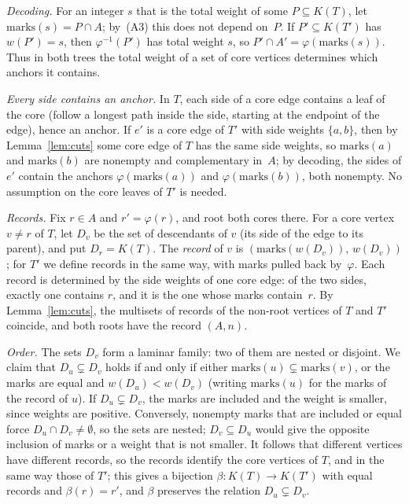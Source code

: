 \documentclass[11pt]{article}
\theoremstyle{definition}
\theoremstyle{remark}
\begin{document}
\emph{Decoding.} For an integer $s$ that is the total weight of some
$P\subseteq K(T)$, let $\mathrm{marks}(s)=P\cap A$; by~(A3) this does not depend
on~$P$. If $P'\subseteq K(T')$ has $w(P')=s$, then $\varphi^{-1}(P')$ has total
weight $s$, so $P'\cap A'=\varphi(\mathrm{marks}(s))$. Thus in both trees the
total weight of a set of core vertices determines which anchors it contains.

\emph{Every side contains an anchor.} In $T$, each side of a core edge contains
a leaf of the core (follow a longest path inside the side, starting at the
endpoint of the edge), hence an anchor. If $e'$ is a core edge of $T'$ with side
weights $\{a,b\}$, then by Lemma~\ref{lem:cuts} some core edge of $T$ has the same
side weights, so $\mathrm{marks}(a)$ and $\mathrm{marks}(b)$ are nonempty and
complementary in~$A$; by decoding, the sides of $e'$ contain the anchors
$\varphi(\mathrm{marks}(a))$ and $\varphi(\mathrm{marks}(b))$, both nonempty. No
assumption on the core leaves of $T'$ is needed.

\emph{Records.} Fix $r\in A$ and $r'=\varphi(r)$, and root both cores there. For
a core vertex $v\ne r$ of $T$, let $D_v$ be the set of descendants of $v$ (its
side of the edge to its parent), and put $D_r=K(T)$. The \emph{record} of $v$ is
$(\mathrm{marks}(w(D_v)),\,w(D_v))$; for $T'$ we define records in the same way,
with marks pulled back by~$\varphi$. Each record is determined by the side weights
of one core edge: of the two sides, exactly one contains $r$, and it is the one
whose marks contain~$r$. By Lemma~\ref{lem:cuts}, the multisets of records of the
non-root vertices of $T$ and $T'$ coincide, and both roots have the record
$(A,n)$.

\emph{Order.} The sets $D_v$ form a laminar family: two of them are nested or
disjoint. We claim that $D_u\subsetneq D_v$ holds if and only if either
$\mathrm{marks}(u)\subsetneq\mathrm{marks}(v)$, or the marks are equal and
$w(D_u)<w(D_v)$ (writing $\mathrm{marks}(u)$ for the marks of the record of $u$).
If $D_u\subsetneq D_v$, the marks are included and the weight is smaller, since
weights are positive. Conversely, nonempty marks that are included or equal force
$D_u\cap D_v\ne\emptyset$, so the sets are nested; $D_v\subseteq D_u$ would give
the opposite inclusion of marks or a weight that is not smaller. It follows that
different vertices have different records, so the records identify the core
vertices of $T$, and in the same way those of $T'$; this gives a bijection
$\beta:K(T)\to K(T')$ with equal records and $\beta(r)=r'$, and $\beta$
preserves the relation $D_u\subsetneq D_v$.
\end{document}
